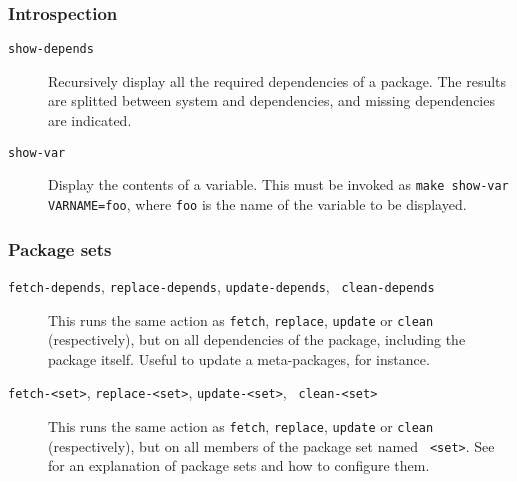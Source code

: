 \subsubsection{Introspection}
\begin{description}
   \item[{\tt show-depends}] Recursively display all the required dependencies
   of a package. The results are splitted between system and \robotpkg
   dependencies, and missing dependencies are indicated.

   \item[{\tt show-var}] Display the contents of a variable. This must be
   invoked as {\tt make show-var VARNAME=foo}, where {\tt foo} is the name of
   the variable to be displayed.
\end{description}

\subsubsection{Package sets}

\begin{description}
   \item[{\tt fetch-depends}, {\tt replace-depends}, {\tt update-depends}, {\tt
   clean-depends}]
   This runs the same action as {\tt fetch}, {\tt replace}, {\tt update} or
   {\tt clean} (respectively), but on all dependencies of the package,
   including the package itself. Useful to update a meta-packages, for instance.

   \item[{\tt fetch-<set>}, {\tt replace-<set>}, {\tt update-<set>}, {\tt
   clean-<set>}]
   This runs the same action as {\tt fetch}, {\tt replace}, {\tt update} or
   {\tt clean} (respectively), but on all members of the package set named {\tt
   <set>}. See
   for an explanation of package sets and how to configure them.

\end{description}
